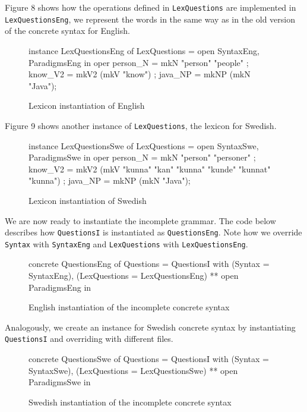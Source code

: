 Figure 8 shows how the operations defined in \texttt{LexQuestions} are implemented in \texttt{LexQuestionsEng}, we represent the words in the same  way as in the old version of the concrete syntax for English.

\begin{figure}[H]
\begin{code}
instance LexQuestionsEng of LexQuestions = open SyntaxEng, ParadigmsEng in {
    oper
      person_N = mkN "person" "people" ;
      know_V2 = mkV2 (mkV "know") ;	  
      java_NP = mkNP (mkN "Java");
}
\end{code}
\caption{Lexicon instantiation of English}
\end{figure}

Figure 9 shows another instance of \texttt{LexQuestions}, the lexicon for Swedish.

\begin{figure}[H]
\begin{code}
instance LexQuestionsSwe of LexQuestions = open SyntaxSwe, ParadigmsSwe in {
    oper
      person_N = mkN "person" "personer" ;
      know_V2 = mkV2 (mkV "kunna" "kan" "kunna" "kunde" "kunnat" "kunna") ;	  
      java_NP = mkNP (mkN "Java");
}
\end{code}
\caption{Lexicon instantiation of Swedish}
\end{figure}

We are now ready to instantiate the incomplete grammar. The code below describes how \texttt{QuestionsI} is instantiated as \texttt{QuestionsEng}. Note how we override \texttt{Syntax} with \texttt{SyntaxEng} and \texttt{LexQuestions} with \texttt{LexQuestionsEng}.

\begin{figure}[H]
\begin{code}
concrete QuestionsEng of Questions = QuestionsI with 
                                             (Syntax = SyntaxEng), 
                                             (LexQuestions = LexQuestionsEng) 
                                             ** open ParadigmsEng in {}
\end{code}
\caption{English instantiation of the incomplete concrete syntax}
\end{figure}

Analogously, we create an instance for Swedish concrete syntax by instantiating \texttt{QuestionsI} and overriding with different files.

\begin{figure}[H]
\begin{code}
concrete QuestionsSwe of Questions = QuestionsI with 
                                             (Syntax = SyntaxSwe), 
                                             (LexQuestions = LexQuestionsSwe) 
                                             ** open ParadigmsSwe in {}
\end{code}
\caption{Swedish instantiation of the incomplete concrete syntax}
\end{figure}